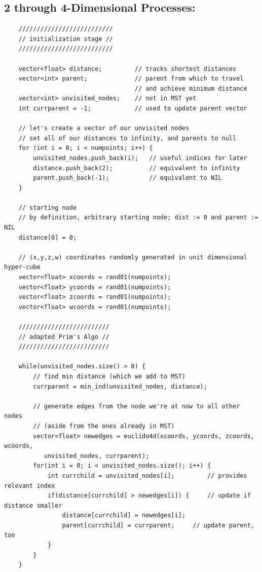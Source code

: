 \documentclass[conference]{styles/acmsiggraph}
\newcommand{\?}{\stackrel{?}{=}}
\begin{document}
\subsection{2 through 4-Dimensional Processes:}
\begin{verbatim}
    //////////////////////////
    // initialization stage //
    //////////////////////////
    
    vector<float> distance;         // tracks shortest distances
    vector<int> parent;             // parent from which to travel 
                                    // and achieve minimum distance
    vector<int> unvisited_nodes;    // not in MST yet
    int currparent = -1;            // used to update parent vector
    
    // let's create a vector of our unvisited nodes
    // set all of our distances to infinity, and parents to null
    for (int i = 0; i < numpoints; i++) {
        unvisited_nodes.push_back(i);   // useful indices for later
        distance.push_back(2);          // equivalent to infinity
        parent.push_back(-1);           // equivalent to NIL
    }

    // starting node
    // by definition, arbitrary starting node; dist := 0 and parent := NIL
    distance[0] = 0;   
    
    // (x,y,z,w) coordinates randomly generated in unit dimensional hyper-cube
    vector<float> xcoords = rand01(numpoints);
    vector<float> ycoords = rand01(numpoints);
    vector<float> zcoords = rand01(numpoints);
    vector<float> wcoords = rand01(numpoints);
    
    /////////////////////////
    // adapted Prim's Algo //
    /////////////////////////

    while(unvisited_nodes.size() > 0) {
        // find min distance (which we add to MST)
        currparent = min_ind(unvisited_nodes, distance);                      

        // generate edges from the node we're at now to all other nodes 
        // (aside from the ones already in MST)
        vector<float> newedges = euclido4d(xcoords, ycoords, zcoords, wcoords,
           unvisited_nodes, currparent);
        for(int i = 0; i < unvisited_nodes.size(); i++) {
            int currchild = unvisited_nodes[i];         // provides relevant index
            if(distance[currchild] > newedges[i]) {     // update if distance smaller
                distance[currchild] = newedges[i];
                parent[currchild] = currparent;     // update parent, too
            }
        }
    }
\end{verbatim}
\end{document}
